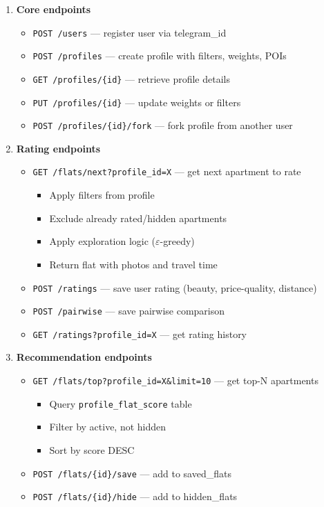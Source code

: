 \documentclass[12pt,a4paper]{article}
\begin{document}
\begin{enumerate}
    \item \textbf{Core endpoints}
    \begin{itemize}
        \item \texttt{POST /users} — register user via telegram\_id
        \item \texttt{POST /profiles} — create profile with filters, weights, POIs
        \item \texttt{GET /profiles/\{id\}} — retrieve profile details
        \item \texttt{PUT /profiles/\{id\}} — update weights or filters
        \item \texttt{POST /profiles/\{id\}/fork} — fork profile from another user
    \end{itemize}
    
    \item \textbf{Rating endpoints}
    \begin{itemize}
        \item \texttt{GET /flats/next?profile\_id=X} — get next apartment to rate
        \begin{itemize}
            \item Apply filters from profile
            \item Exclude already rated/hidden apartments
            \item Apply exploration logic ($\varepsilon$-greedy)
            \item Return flat with photos and travel time
        \end{itemize}
        \item \texttt{POST /ratings} — save user rating (beauty, price-quality, distance)
        \item \texttt{POST /pairwise} — save pairwise comparison
        \item \texttt{GET /ratings?profile\_id=X} — get rating history
    \end{itemize}
    
    \item \textbf{Recommendation endpoints}
    \begin{itemize}
        \item \texttt{GET /flats/top?profile\_id=X\&limit=10} — get top-N apartments
        \begin{itemize}
            \item Query \texttt{profile\_flat\_score} table
            \item Filter by active, not hidden
            \item Sort by score DESC
        \end{itemize}
        \item \texttt{POST /flats/\{id\}/save} — add to saved\_flats
        \item \texttt{POST /flats/\{id\}/hide} — add to hidden\_flats
    \end{itemize}
    

\end{enumerate}
\end{document}
